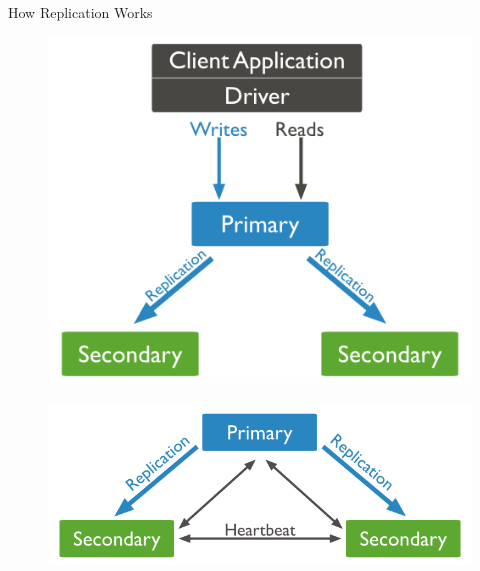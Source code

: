 \documentclass{beamer}
\begin{document}
\begin{frame}{How Replication Works}

\begin{minipage}[t]{0.48\linewidth}
	\begin{figure}
		\includegraphics[width=\textwidth]{replica-1}
	\end{figure}
\end{minipage}
\hfill
\begin{minipage}[t]{0.48\linewidth}
	\begin{figure}
		\includegraphics[width=\textwidth]{replica-2}
	\end{figure}
\end{minipage}

\end{frame}
\end{document}
